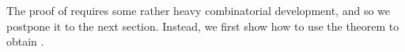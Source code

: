 

%
%
%
%

The proof of  requires some rather heavy combinatorial development, and so we postpone it to the next section. Instead, we first show how to use the theorem to obtain .


